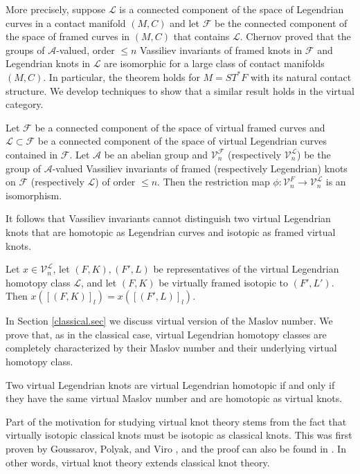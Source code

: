 More precisely, suppose $\mathcal{L}$ is a connected component of the space of Legendrian curves in a contact manifold $(M,C)$ and let $\mathcal{F}$ be the connected component of the space of framed curves in $(M,C)$ that contains $\mathcal{L}$.  Chernov proved that the groups of $\mathcal{A}$-valued, order $\leq n$ Vassiliev invariants of framed knots in $\mathcal{F}$ and Legendrian knots in $\mathcal{L}$ are isomorphic for a large class of contact manifolds $(M,C)$.  In particular, the theorem holds for $M=ST^*F$ with its natural contact structure. We develop techniques to show that a similar result holds in the virtual category.
\begin{thm} \label{mainthm}
Let $\mathcal{F}$ be a connected component of the space of virtual framed curves and $\mathcal{L}\subset\mathcal{F}$ be a connected component of the space of virtual Legendrian curves contained in $\mathcal{F}$.  Let $\mathcal{A}$ be an abelian group and $\mathcal{V}_n^\mathcal{F}$ (respectively $\mathcal{V}_n^\mathcal{L}$) be the group of $\mathcal{A}$-valued Vassiliev invariants of framed (respectively Legendrian) knots on $\mathcal{F}$ (respectively $\mathcal{L}$) of order $\leq n$.   Then the restriction map $\phi:\mathcal{V}_n^{F}\rightarrow\mathcal{V}_n^\mathcal{L}$ is an isomorphism.
\end{thm}
It follows that Vassiliev invariants cannot distinguish two virtual Legendrian knots that are homotopic as Legendrian curves and isotopic as framed virtual knots.

\begin{thm}\label{maincor}
Let $x\in \mathcal{V}_n^\mathcal{L}$, let $(F, K), (F', L)$ be representatives of the virtual Legendrian homotopy class $\mathcal{L}$, and let $(F, K)$ be virtually framed isotopic to $(F', L')$.  Then $x([(F, K)]_l) = x([(F', L)]_l)$.
\end{thm}

In Section \ref{classical.sec} we discuss virtual version of the Maslov number.  We prove that, as in the classical case, virtual Legendrian homotopy classes are completely characterized by their Maslov number and their underlying virtual homotopy class.

\begin{thm} Two virtual Legendrian knots are virtual Legendrian homotopic if and only if they have the same virtual Maslov number and are homotopic as virtual knots.
\end{thm}


Part of the motivation for studying virtual knot theory stems from the fact that virtually isotopic classical knots must be isotopic as classical knots.  This was first proven by Goussarov, Polyak, and Viro \cite{GPV}, and the proof can also be found in \cite{Kauffman}.  In other words, virtual knot theory extends classical knot theory.

